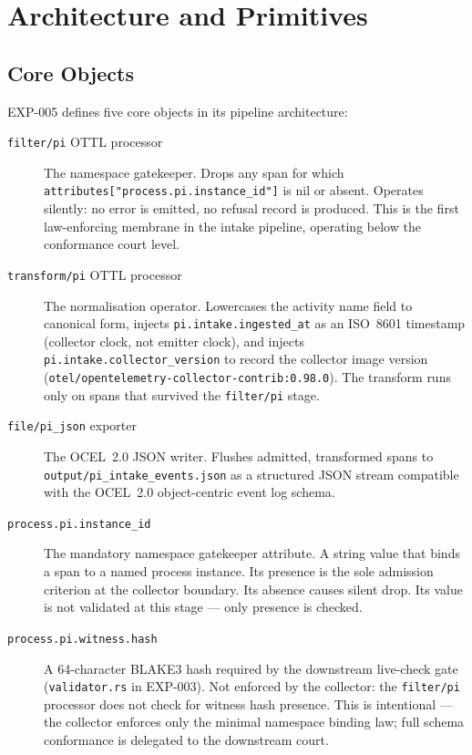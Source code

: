 \section{Architecture and Primitives}
\label{sec:otel-weaver-exp-005-collector-to-intake-architecture}

\subsection{Core Objects}
\label{sec:otel-weaver-exp-005-collector-to-intake-architecture-objects}

EXP-005 defines five core objects in its pipeline architecture:

\begin{description}
  \item[\texttt{filter/pi} OTTL processor] The namespace gatekeeper. Drops any span for which
        \texttt{attributes["process.pi.instance\_id"]} is nil or absent. Operates silently:
        no error is emitted, no refusal record is produced. This is the first law-enforcing
        membrane in the intake pipeline, operating below the conformance court level.

  \item[\texttt{transform/pi} OTTL processor] The normalisation operator. Lowercases the
        activity name field to canonical form, injects \texttt{pi.intake.ingested\_at} as an
        ISO~8601 timestamp (collector clock, not emitter clock), and injects
        \texttt{pi.intake.collector\_version} to record the collector image version
        (\texttt{otel/opentelemetry-collector-contrib:0.98.0}). The transform runs only on
        spans that survived the \texttt{filter/pi} stage.

  \item[\texttt{file/pi\_json} exporter] The OCEL~2.0 JSON writer. Flushes admitted,
        transformed spans to \texttt{output/pi\_intake\_events.json} as a structured JSON
        stream compatible with the OCEL~2.0 object-centric event log schema.

  \item[\texttt{process.pi.instance\_id}] The mandatory namespace gatekeeper attribute. A
        string value that binds a span to a named process instance. Its presence is the sole
        admission criterion at the collector boundary. Its absence causes silent drop. Its
        value is not validated at this stage --- only presence is checked.

  \item[\texttt{process.pi.witness.hash}] A 64-character BLAKE3 hash required by the
        downstream live-check gate (\texttt{validator.rs} in EXP-003). Not enforced by the
        collector: the \texttt{filter/pi} processor does not check for witness hash presence.
        This is intentional --- the collector enforces only the minimal namespace binding law;
        full schema conformance is delegated to the downstream court.
\end{description}

